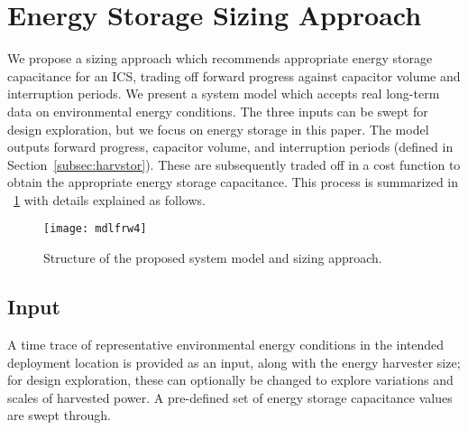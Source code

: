 
\section{Energy Storage Sizing Approach} \label{section:approach}

We propose a sizing approach which recommends appropriate energy storage capacitance for an ICS, trading off forward progress against capacitor volume and interruption periods. We present a system model which accepts real long-term data on environmental energy conditions. The three inputs can be swept for design exploration, but we focus on energy storage in this paper. The model outputs forward progress, capacitor volume, and interruption periods (defined in Section~\ref{subsec:harvstor}). These are subsequently traded off in a cost function to obtain the appropriate energy storage capacitance. This process is summarized in \figurename{~\ref{fig:sizingapproach}} with details explained as follows. 

\begin{figure}[!t]
    \centering
    \texttt{[image: mdlfrw4]}
    \caption{Structure of the proposed system model and sizing approach.}
    \label{fig:sizingapproach}
\end{figure}
    
\subsection{Input}
A time trace of representative environmental energy conditions in the intended deployment location is provided as an input, along with the energy harvester size; for design exploration, these can optionally be changed to explore variations and scales of harvested power. A pre-defined set of energy storage capacitance values are swept through. 

